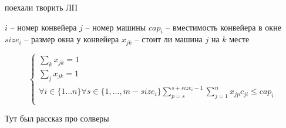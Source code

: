 поехали творить ЛП

$i$ --  номер конвейера
$j$ --  номер машины
$cap_i$ -- вместимость конвейера в окне
$size_i$ -- размер окна у конвейера
$x_{j k}$ -- стоит ли машина $j$ на $k$ месте

\[
    \begin{cases}
        \sum_{k} x_{j k} = 1\\
        \sum_{j} x_{j k} = 1\\
        \forall i \in \{1 \dots n\} \forall s \in \{1, \dots, m - size_i\}
        \sum_{p = s}^{s + size_i - 1} \sum_{j = 1}^n x_{j p} c_{j i} \leq cap_i\\
    \end{cases}
\]


Тут был рассказ про солверы